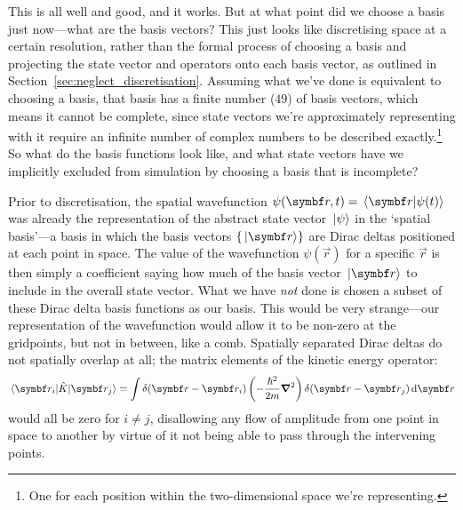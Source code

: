 This is all well and good, and it works. But at what point did we choose a basis just now---what are the basis vectors? This just looks like discretising space at a certain resolution, rather than the formal process of choosing a basis and projecting the state vector and operators onto each basis vector, as outlined in Section~\ref{sec:neglect_discretisation}. Assuming what we've done is equivalent to choosing a basis, that basis has a finite number ($49$) of basis vectors, which means it cannot be complete, since state vectors we're approximately representing with it require an infinite number of complex numbers to be described exactly.\footnote{One for each position within the two-dimensional space we're representing.} So what do the basis functions look like, and what state vectors have we implicitly excluded from simulation by choosing a basis that is incomplete?

Prior to discretisation, the spatial wavefunction $\psi(\vec r, t) = \braket{\vec r}{\psi(t)}$ was already the representation of the abstract state vector $\ket{\psi}$ in the `spatial basis'---a basis in which the basis vectors $\{\ket{\vec r}\}$ are Dirac deltas positioned at each point in space. The value of the wavefunction $\psi(\vec r)$ for a specific $\vec r$ is then simply a coefficient saying how much of the basis vector $\ket{\vec r}$ to include in the overall state vector. What we have \emph{not} done is chosen a subset of these Dirac delta basis functions as our basis. This would be very strange---our representation of the wavefunction would allow it to be non-zero at the gridpoints, but not in between, like a comb. Spatially separated Dirac deltas do not spatially overlap at all; the matrix elements of the kinetic energy operator:
\begin{align}
\matrixel{\vec r_i}{\hat K}{\vec r_j} = \int \delta(\vec r - \vec r_i)\left(-\frac{\hbar^2}{2m}\grad^2\right)\delta(\vec r - \vec r_j)\,\dd \vec r
\end{align}
would all be zero for $i\neq j$, disallowing any flow of amplitude from one point in space to another by virtue of it not being able to pass through the intervening points.

